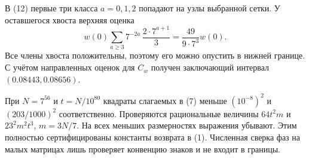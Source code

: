 \documentclass[11pt,a4paper]{article}
\begin{document}
В (12) первые три класса $a=0,1,2$ попадают на узлы выбранной сетки. У оставшегося хвоста верхняя оценка
\[
            w(0)\sum_{a\ge3} 7^{-2a}\,\frac{2\cdot7^{a+1}}3
                         =\frac{49}{9\cdot7^3}w(0).
\]
Все члены хвоста положительны, поэтому его можно опустить в нижней границе. С учётом направленных оценок для $C_w$ получен заключающий интервал $(0.08443,0.08656)$.

При $N=7^{56}$ и $t=N/10^{80}$ квадраты слагаемых в (7) меньше $(10^{-8})^2$ и $(203/1000)^2$ соответственно. Проверяются рациональные величины $64t^2m$ и $23^2m^2t^3$, $m=3N/7$. На всех меньших размерностях выражения убывают. Этим полностью сертифицированы константы возврата в (1). Численная сверка фаз на малых матрицах лишь проверяет конвенцию знаков и не входит в границы.
\end{document}
